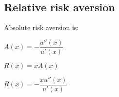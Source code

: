 
\subsection{Relative risk aversion}

Absolute risk aversion is:

\(A(x)=-\dfrac{u''(x)}{u'(x)}\)

\(R(x)=xA(x)\)

\(R(x)=-\dfrac{xu''(x)}{u'(x)}\)

